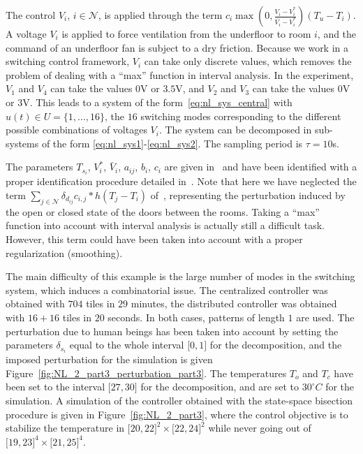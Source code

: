 The control $V_i$, $i \in \mathcal{N}$, is applied through the term
$c_i \max(0,\frac{V_i - V_i^\text{*}}{\bar{ V_i} -
  V_i^{\text{*}}})(T_u - T_i)$.  A voltage $V_i$ is applied to force
ventilation from the underfloor to room $i$, and the command of an
underfloor fan is subject to a dry friction.  Because we work in a
switching control framework, $V_i$ can take only discrete values, which
removes the problem of dealing with a ``max'' function in interval
analysis. In the experiment, $V_1$ and $V_4$ can take the values $0$V
or $3.5$V, and $V_2$ and $V_3$ can take the values $0$V or $3$V. This
leads to a system of the form~\eqref{eq:nl_sys_central} with $u(t) \in U =\{
1, \dots, 16 \}$, the $16$ switching modes corresponding to the
different possible combinations of voltages $V_i$. The system can be decomposed in
sub-systems of the form \eqref{eq:nl_sys1}-\eqref{eq:nl_sys2}. The sampling
period is $\tau = 10$s.


The parameters $T_{s_i}$, $V_i^\text{*}$, $\bar V_i$, $a_{ij}$, $b_i$,
$c_i$ are given in~\cite{meyer:tel-01232640} and have been identified
with a proper identification procedure detailed
in~\cite{meyer2014ecc}.  Note that here we have neglected the term
$\sum_{j \in \mathcal{N}} \delta_{d_{ij}}c_{i,j} \ast h(T_j - T_i)$
of~\cite{meyer:tel-01232640}, representing the perturbation induced by
the open or closed state of the doors between the rooms. Taking a
``max'' function into account with interval analysis is actually still
a difficult task. However, this term could have been taken into
account with a proper regularization (smoothing).

The main difficulty of this example is the large number of modes in
the switching system, which induces a combinatorial issue.
%
The centralized controller was obtained with $704$ tiles in $29$
minutes, the distributed controller was obtained with $16 + 16$ tiles
in $20$ seconds. In both cases, patterns of length $1$ are used. The
perturbation due to human beings has been taken into account by
setting the parameters $\delta_{s_i}$ equal to the whole interval
$\lbrack 0,1 \rbrack$ for the decomposition, and the imposed
perturbation for the simulation is given
Figure~\ref{fig:NL_2_part3_perturbation_part3}.  The temperatures $T_o$ and $T_c$
have been set to the interval $\lbrack27,30\rbrack$ for the
decomposition, and are set to $30^\circ C$ for the simulation.  A
simulation of the controller obtained with the state-space bisection
procedure is given in Figure~\ref{fig:NL_2_part3}, where the control
objective is to stabilize the temperature in $\lbrack 20 , 22 \rbrack
^2 \times \lbrack 22 , 24 \rbrack^2$ while never going out of $\lbrack
19 , 23 \rbrack ^4 \times \lbrack 21 , 25 \rbrack ^4$.


